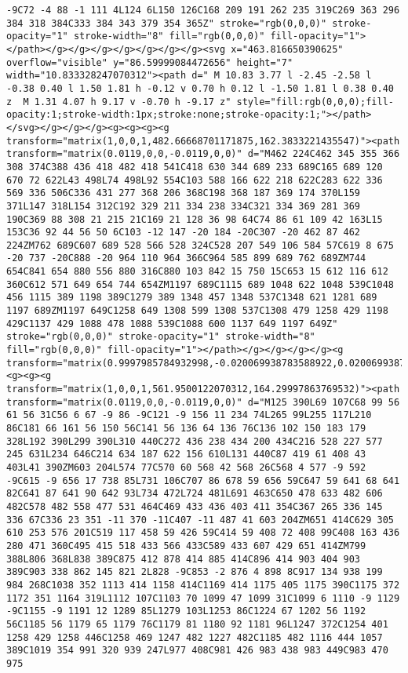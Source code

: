 \documentclass[
]{article}
\begin{document}
\begin{verbatim}
-9C72 -4 88 -1 111 4L124 6L150 126C168 209 191 262 235 319C269 363 296 384 318 384C333 384 343 379 354 365Z" stroke="rgb(0,0,0)" stroke-opacity="1" stroke-width="8" fill="rgb(0,0,0)" fill-opacity="1"></path></g></g></g></g></g></g></g><svg x="463.816650390625" overflow="visible" y="86.59999084472656" height="7" width="10.833328247070312"><path d=" M 10.83 3.77 l -2.45 -2.58 l -0.38 0.40 l 1.50 1.81 h -0.12 v 0.70 h 0.12 l -1.50 1.81 l 0.38 0.40 z  M 1.31 4.07 h 9.17 v -0.70 h -9.17 z" style="fill:rgb(0,0,0);fill-opacity:1;stroke-width:1px;stroke:none;stroke-opacity:1;"></path></svg></g></g></g><g><g><g><g transform="matrix(1,0,0,1,482.66668701171875,162.3833221435547)"><path transform="matrix(0.0119,0,0,-0.0119,0,0)" d="M462 224C462 345 355 366 308 374C388 436 418 482 418 541C418 630 344 689 233 689C165 689 120 670 72 622L43 498L74 498L92 554C103 588 166 622 218 622C283 622 336 569 336 506C336 431 277 368 206 368C198 368 187 369 174 370L159 371L147 318L154 312C192 329 211 334 238 334C321 334 369 281 369 190C369 88 308 21 215 21C169 21 128 36 98 64C74 86 61 109 42 163L15 153C36 92 44 56 50 6C103 -12 147 -20 184 -20C307 -20 462 87 462 224ZM762 689C607 689 528 566 528 324C528 207 549 106 584 57C619 8 675 -20 737 -20C888 -20 964 110 964 366C964 585 899 689 762 689ZM744 654C841 654 880 556 880 316C880 103 842 15 750 15C653 15 612 116 612 360C612 571 649 654 744 654ZM1197 689C1115 689 1048 622 1048 539C1048 456 1115 389 1198 389C1279 389 1348 457 1348 537C1348 621 1281 689 1197 689ZM1197 649C1258 649 1308 599 1308 537C1308 479 1258 429 1198 429C1137 429 1088 478 1088 539C1088 600 1137 649 1197 649Z" stroke="rgb(0,0,0)" stroke-opacity="1" stroke-width="8" fill="rgb(0,0,0)" fill-opacity="1"></path></g></g></g></g><g transform="matrix(0.9997985784932998,-0.020069938783588922,0.020069938783588922,0.9997985784932998,-3.055990041852965,12.329931027718743)"><g><g><g transform="matrix(1,0,0,1,561.9500122070312,164.29997863769532)"><path transform="matrix(0.0119,0,0,-0.0119,0,0)" d="M125 390L69 107C68 99 56 61 56 31C56 6 67 -9 86 -9C121 -9 156 11 234 74L265 99L255 117L210 86C181 66 161 56 150 56C141 56 136 64 136 76C136 102 150 183 179 328L192 390L299 390L310 440C272 436 238 434 200 434C216 528 227 577 245 631L234 646C214 634 187 622 156 610L131 440C87 419 61 408 43 403L41 390ZM603 204L574 77C570 60 568 42 568 26C568 4 577 -9 592 -9C615 -9 656 17 738 85L731 106C707 86 678 59 656 59C647 59 641 68 641 82C641 87 641 90 642 93L734 472L724 481L691 463C650 478 633 482 606 482C578 482 558 477 531 464C469 433 436 403 411 354C367 265 336 145 336 67C336 23 351 -11 370 -11C407 -11 487 41 603 204ZM651 414C629 305 610 253 576 201C519 117 458 59 426 59C414 59 408 72 408 99C408 163 436 280 471 360C495 415 518 433 566 433C589 433 607 429 651 414ZM799 388L806 368L838 389C875 412 878 414 885 414C896 414 903 404 903 389C903 338 862 145 821 2L828 -9C853 -2 876 4 898 8C917 134 938 199 984 268C1038 352 1113 414 1158 414C1169 414 1175 405 1175 390C1175 372 1172 351 1164 319L1112 107C1103 70 1099 47 1099 31C1099 6 1110 -9 1129 -9C1155 -9 1191 12 1289 85L1279 103L1253 86C1224 67 1202 56 1192 56C1185 56 1179 65 1179 76C1179 81 1180 92 1181 96L1247 372C1254 401 1258 429 1258 446C1258 469 1247 482 1227 482C1185 482 1116 444 1057 389C1019 354 991 320 939 247L977 408C981 426 983 438 983 449C983 470 975 
\end{verbatim}
\end{document}
